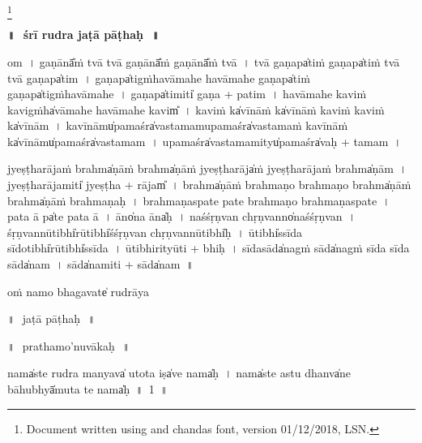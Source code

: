 \documentclass[parskip, DIV=14]{scrartcl}
\renewcommand{\thefootnote}{\fnsymbol{footnote}} %
\begin{document}

\vspace{-1.5cm}

\LARGE\let\thefootnote\relax\footnote{\color{lightgray} Document written using \XeLaTeX{} and chandas font,  version 01/12/2018, LSN.}

\Huge
\begin{center}
\textbf{॥\,~śrī rudra jaṭā pāṭhaḥ\,~॥}
\end{center}

\Large


{\centering	

\vspace{1cm}

om~।
ga॒ṇānā̎ṁ tvā tvā ga॒ṇānā̎ṁ ga॒ṇānā̎ṁ tvā~।
tvā॒ ga॒ṇapa̍tiṁ ga॒ṇapa̍tiṁ tvā tvā ga॒ṇapa̍tim~।
ga॒ṇapa̍tigṁhavāmahe havāmahe ga॒ṇapa̍tiṁ
ga॒ṇapa̍tigṁhavāmahe~।
ga॒ṇapa̍ti॒miti̍ ga॒ṇa + pa॒ti॒m~।
ha॒vā॒ma॒he॒ ka॒viṁ ka॒vigṁha̍vāmahe havāmahe ka॒vim̎~।
ka॒viṁ ka̍vī॒nāṁ ka̍vī॒nāṁ ka॒viṁ ka॒viṁ ka̍vī॒nām~।
ka॒vī॒nāmu̍pa॒maśra̍vastamamupa॒maśra̍vastamaṁ
kavī॒nāṁ ka̍vī॒nāmu̍pa॒maśra̍vastamam~।
u॒pa॒maśra̍vastama॒mityu̍pa॒maśra̍vaḥ + ta॒ma॒m~।


jye॒ṣṭha॒rāja॒ṁ brahma̍ṇā॒ṁ brahma̍ṇāṁ jyeṣṭha॒rāja̍ṁ
jyeṣṭha॒rāja॒ṁ brahma̍ṇām~।
jye॒ṣṭha॒rāja॒miti̍ jyeṣṭha + rājam̎~।
brahma̍ṇāṁ brahmaṇo brahmaṇo॒ brahma̍ṇā॒ṁ
brahma̍ṇāṁ brahmaṇaḥ~।
bra॒hma॒ṇa॒spa॒te॒ pa॒te॒ bra॒hma॒ṇo॒ bra॒hma॒ṇa॒spa॒te॒~। 
pa॒ta॒ ā pa̍te pata॒ ā~।
āno̍na॒ āna̍ḥ~।
na॒śśṛ॒ṇvan chṛ॒ṇvanno̍naśśṛ॒ṇvan~।
śṛ॒ṇvannū॒tibhi̍rū॒tibhi̍śśṛ॒ṇvan chṛ॒ṇvannū॒tibhi̍ḥ~।
ū॒tibhi̍ssīda sīdo॒tibhi̍rū॒tibhi̍ssīda~।
ū॒tibhi॒rityū॒ti + bhi॒ḥ~।
sī॒da॒sāda̍na॒gṁ sāda̍nagṁ sīda sīda॒ sāda̍nam~।
sāda̍na॒miti॒ + sāda̍nam~॥ 

\vspace{1cm}

oṁ namo bhagavate̍ rudrā॒ya

\newpage
\LARGE
॥\,~jaṭā pāṭhaḥ\,~॥\\
\vspace{0.5cm}

\LARGE
॥\,~prathamo'nuvākaḥ\,~॥\\
\Large
\vspace{0.5cm}

nama̍ste rudra ma॒nyava̍ u॒tota॒ iṣa̍ve॒ nama̍ḥ~।
nama̍ste astu॒ dhanva̍ne bā॒hubhyā̍mu॒ta te॒ nama̍ḥ~॥~1~॥

}
\end{document}

